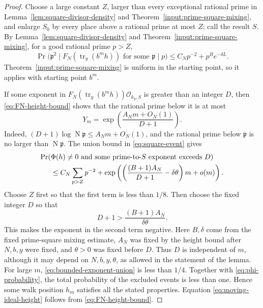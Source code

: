 \documentclass[11pt,reqno]{amsart}
\theoremstyle{definition}
\theoremstyle{remark}
\newcommand{\cO}{\mathcal O}
\newcommand{\Tr}{\operatorname{tr}}
\newcommand{\Norm}{\operatorname{N}}
\begin{document}
\begin{proof}
Choose a large constant \(Z\), larger than every exceptional rational prime
in Lemma~\ref{lem:square-divisor-density} and
Theorem~\ref{input:prime-square-mixing}, and enlarge \(S_0\) by every place
above a rational prime at most \(Z\); call the result \(S\).  By
Lemma~\ref{lem:square-divisor-density} and
Theorem~\ref{input:prime-square-mixing}, for a good rational prime \(p>Z\),
\begin{equation}\label{eq:square-event}
 \Pr\bigl(\mathfrak p^2\mid F_N(\Tr_y(b^mh))
       \text{ for some }\mathfrak p\mid p\bigr)
 \le C_Np^{-2}+p^B e^{-\delta L}.
\end{equation}
Theorem~\ref{input:prime-square-mixing} is uniform in the starting point,
so it applies with starting point \(b^m\).

If some exponent in \(F_N(\Tr_y(b^mh))\cO_{k_y,S}\) is greater than an
integer \(D\), then \eqref{eq:FN-height-bound} shows that the rational prime
below it is at most
\[
 Y_m=\exp\left(\frac{A_Nm+O_N(1)}{D+1}\right).
\]
Indeed, \((D+1)\log\Norm\mathfrak p\le A_Nm+O_N(1)\), and the rational
prime below \(\mathfrak p\) is no larger than \(\Norm\mathfrak p\).  The
union bound in \eqref{eq:square-event} gives
\begin{align}
 \Pr(&\Phi(h)\ne0\text{ and some prime-to-}S
          \text{ exponent exceeds }D)\notag\\
 &\le C_N\sum_{p>Z}p^{-2}
 +\exp\left(
   \left(\frac{(B+1)A_N}{D+1}-\delta\theta\right)m+o(m)
          \right).
 \label{eq:bounded-exponent-union}
\end{align}
Choose \(Z\) first so that the first term is less than \(1/8\).  Then choose
the fixed integer \(D\) so that
\begin{equation}\label{eq:explicit-sieve-exponent-choice}
 D+1>\frac{(B+1)A_N}{\delta\theta}.
\end{equation}
This makes the exponent in the second term negative.  Here \(B,\delta\)
come from the fixed prime-square mixing estimate, \(A_N\) was fixed by the
height bound after \(N,b,y\) were fixed, and \(\theta>0\) was fixed before
\(D\).  Thus \(D\) is independent of \(m\), although it may depend on
\(N,b,y,\theta\), as allowed in the statement of the lemma.
For large \(m\), \eqref{eq:bounded-exponent-union} is less than \(1/4\).
Together with \eqref{eq:phi-probability}, the total probability of the
excluded events is less than one.  Hence some walk position \(h_m\)
satisfies all the stated properties.  Equation
\eqref{eq:moving-ideal-height} follows from
\eqref{eq:FN-height-bound}.
\end{proof}
\end{document}
